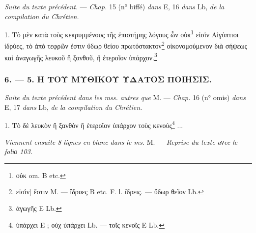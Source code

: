 \documentclass[a4paper, 11pt, oneside, polutonikogreek, french]{article}
\begin{document}
\emph{Suite du texte précédent.} --- \emph{Chap.} 15 (n° biffé) \emph{dans} E, 16 \emph{dans} Lb, \emph{de la compilation du Chrétien.}

\bigskip

1. Τὸ μὲν κατὰ τοὺς κεκρυμμένους τῆς ἐπιστήμης λόγους ὧν οὐκ\footnote{οὐκ om. B etc.} εἰσὶν Αἰγύπτιοι ἱδρύες, τὸ ἀπὸ τεφρῶν ἐστιν ὕδωρ θείου πρωτόστακτον\footnote{εἰσὶν] ἔστιν M. --- ἴδρυες B etc. F. l. ἴδρεις. --- ὕδωρ θεῖον Lb.} οἰκονομούμενον διὰ σήψεως καὶ ἀναγωγῆς λευκοῦ ἢ ξανθοῦ, ἢ ἑτεροῖον ὑπάρχον.\footnote{ἀγωγῆς E Lb.}

\bigskip
\centerline{\EightStarTaper}
\centerline{\EightStarTaper\EightStarTaper}
\bigskip

\subsubsection{6. --- 5. Η ΤΟΥ ΜΥΘΙΚΟΥ ΥΔΑΤΟΣ ΠΟΙΗΣΙΣ.}

\emph{Suite du texte précédent dans les mss. autres que} M. --- \emph{Chap.} 16 (n° omis) \emph{dans} E, 17 \emph{dans} Lb, \emph{de la compilation du Chrétien.}

\bigskip

1. Τὸ δὲ λευκὸν ἢ ξανθὸν ἢ ἑτεροῖον ὑπάρχον τοὺς κενούς\footnote{ὑπάρχει E ; οὐχ ὑπάρχει Lb. --- τοῖς κενοῖς E Lb.} ...

\emph{Viennent ensuite 8 lignes en blanc dans le ms.} M. --- \emph{Reprise du texte aνec le foliο 103.}
\end{document}

